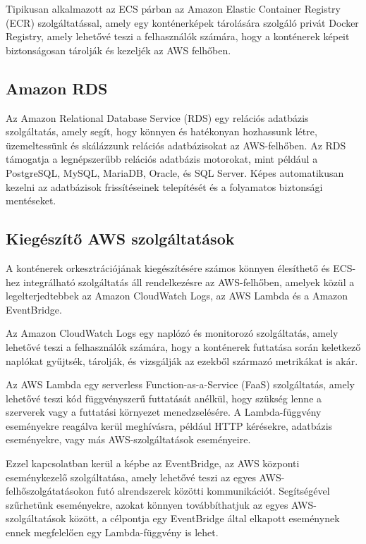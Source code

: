Tipikusan alkalmazott az ECS párban az Amazon Elastic Container Registry (ECR) szolgáltatással, amely egy konténerképek tárolására szolgáló privát Docker Registry, amely lehetővé teszi a felhasználók számára, hogy a konténerek képeit biztonságosan tárolják és kezeljék az AWS felhőben.

\subsection{Amazon RDS}

Az Amazon Relational Database Service (RDS) egy relációs adatbázis szolgáltatás, amely segít, hogy könnyen és hatékonyan hozhassunk létre, üzemeltessünk és skálázzunk relációs adatbázisokat az AWS-felhőben. Az RDS támogatja a legnépszerűbb relációs adatbázis motorokat, mint például a PostgreSQL, MySQL, MariaDB, Oracle, és SQL Server. Képes automatikusan kezelni az adatbázisok frissítéseinek telepítését és a folyamatos biztonsági mentéseket.

\subsection{Kiegészítő AWS szolgáltatások}

A konténerek orkesztrációjának kiegészítésére számos könnyen élesíthető és ECS-hez integrálható szolgáltatás áll rendelkezésre az AWS-felhőben, amelyek közül a legelterjedtebbek az Amazon CloudWatch Logs, az AWS Lambda és a Amazon EventBridge.

Az Amazon CloudWatch Logs egy naplózó és monitorozó szolgáltatás, amely lehetővé teszi a felhasználók számára, hogy a konténerek futtatása során keletkező naplókat gyűjtsék, tárolják, és vizsgálják az ezekből származó metrikákat is akár.

Az AWS Lambda egy serverless Function-as-a-Service (FaaS) szolgáltatás, amely lehetővé teszi kód függvényszerű futtatását anélkül, hogy szükség lenne a szerverek vagy a futtatási környezet menedzselésére. A Lambda-függvény eseményekre reagálva kerül meghívásra, például HTTP kérésekre, adatbázis eseményekre, vagy más AWS-szolgáltatások eseményeire.

Ezzel kapcsolatban kerül a képbe az EventBridge, az AWS központi eseménykezelő szolgáltatása, amely lehetővé teszi az egyes AWS-felhőszolgátatásokon futó alrendszerek közötti kommunikációt. Segítségével szűrhetünk eseményekre, azokat könnyen továbbíthatjuk az egyes AWS-szolgáltatások között, a célpontja egy EventBridge által elkapott eseménynek ennek megfelelően egy Lambda-függvény is lehet.

